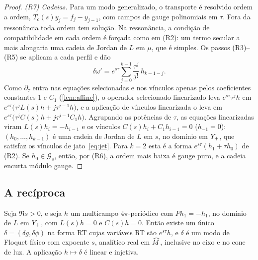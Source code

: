 \begin{proof}
\emph{(R7) Cadeias.} Para um modo generalizado, o transporte é resolvido ordem a ordem,
$T_c(s)y_j=f_j-y_{j-1}$, com campos de gauge polinomiais em $\tau$. Fora da ressonância toda ordem tem solução.
Na ressonância, a condição de compatibilidade em cada ordem é forçada como em (R2): um termo secular a mais
alongaria uma cadeia de Jordan de $L$ em $\mu$, que é simples. Os passos (R3)--(R5) se aplicam a cada perfil e dão
\[
  \delta\omega'=e^{s\tau}\sum_{j=0}^{k-1}\frac{\tau^j}{j!}\,h_{k-1-j}.
\]
Como $\partial_\tau$ entra nas equações selecionadas e nos vínculos apenas pelos coeficientes constantes
$1$ e $C_1$ (\cref{lem:affine}), o operador selecionado linearizado leva $e^{s\tau}\tau^jh$ em
$e^{s\tau}\big(\tau^jL(s)h+j\tau^{j-1}h\big)$, e a aplicação de vínculos linearizada o leva em
$e^{s\tau}\big(\tau^jC(s)h+j\tau^{j-1}C_1h\big)$. Agrupando as potências de $\tau$, as equações linearizadas viram
$L(s)h_i=-h_{i-1}$ e os vínculos $C(s)h_i+C_1h_{i-1}=0$ ($h_{-1}=0$): $(h_0,\dots,h_{k-1})$ é uma cadeia de Jordan de
$L$ em $s$, no domínio em $Y_{+}$, que satisfaz os vínculos de jato~\eqref{eq:jet}. Para $k=2$ esta é a forma
$e^{s\tau}(h_1+\tau h_0)$ de (R2). Se
$h_0\in\mathcal G_s$, então, por (R6), a ordem mais baixa é gauge puro, e a cadeia encurta módulo gauge.
\end{proof}

\subsection{A recíproca}\label{sec:physical-converse}

\begin{lemma}\label{lem:V}
Seja $\Re s>0$, e seja $h$ um multicampo $4\pi$-periódico com $Ph_1=-h_1$, no domínio de $L$ em
$Y_{+}$, com $L(s)h=0$ e $C(s)h=0$. Então existe um único $\delta=(\delta g,\delta\phi)$ na forma RT cujas variáveis
RT são $e^{s\tau}h$, e $\delta$ é um modo de Floquet físico com expoente $s$, analítico real em
$\widehat M$, inclusive no eixo e no cone de luz. A aplicação $h\mapsto\delta$ é linear e injetiva.
\end{lemma}

